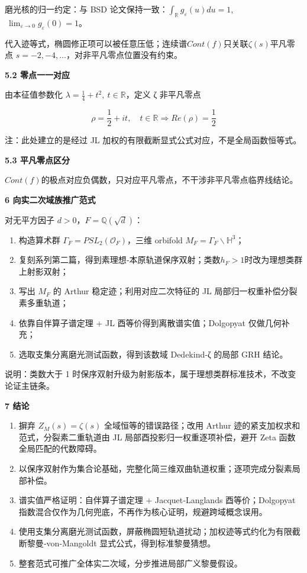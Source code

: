 \documentclass[11pt,a4paper]{ctexart}
\begin{document}
磨光核的归一约定：与 BSD
论文保持一致：\(\int_{\mathbb{R}}^{}g_{\varepsilon}(u)du = 1\),\(\ \lim_{\varepsilon \rightarrow 0}{g_{\varepsilon}(0)} = 1\)。

代入迹等式，椭圆修正项可以被任意压低；连续谱\(Cont(f)\)只关联\(\zeta(s)\)平凡零点
\(s = - 2, - 4,\ldots\)，对非平凡零点位置没有约束。

\textbf{5.2 零点一一对应}

由本征值参数化
\(\lambda = \frac{1}{4} + t^{2},\ t \in \mathbb{R}\)，定义 ζ 非平凡零点

\[\rho = \frac{1}{2} + it,\quad t \in \mathbb{R} \Longrightarrow Re(\rho) = \frac{1}{2}\]

注：此处建立的是经过 JL 加权的有限截断显式公式对应，不是全局函数恒等式。

\textbf{5.3 平凡零点区分}

\(Cont(f)\)的极点对应负偶数，只对应平凡零点，不干涉非平凡零点临界线结论。

\textbf{6 向实二次域族推广范式}

对无平方因子 \(d > 0\)，\(F = \mathbb{Q}\left( \sqrt{d} \right)\)：

\begin{enumerate}
\def\labelenumi{\arabic{enumi}.}
\item
  构造算术群
  \(\Gamma_{F} = {PSL}_{2}\left( \mathcal{O}_{F} \right)\)，三维
  orbifold \(M_{F} = \Gamma_{F}\backslash\mathbb{H}^{3}\)；
\item
  复刻系列第二篇，得到素理想‑本原轨道保序双射；类数\(h_{F} > 1\)时改为理想类群上射影双射；
\item
  写出 \(M_{F}\) 的 Arthur 稳定迹；利用对应二次特征的 JL
  局部归一权重补偿分裂素多重轨道；
\item
  依靠自伴算子谱定理 + JL 酉等价得到离散谱实值；Dolgopyat 仅做几何补充；
\item
  选取支集分离磨光测试函数，得到该数域 Dedekind‑ζ 的局部 GRH 结论。
\end{enumerate}

说明：类数大于 1
时保序双射升级为射影版本，属于理想类群标准技术，不改变论证主链条。

\textbf{7 结论}

\begin{enumerate}
\def\labelenumi{\arabic{enumi}.}
\item
  摒弃 \(Z_{M}(s) = \zeta(s)\) 全域恒等的错误路径；改用 Arthur
  迹的紧支加权求和范式，分裂素二重轨道由 JL
  局部酉投影归一权重逐项补偿，避开 Zeta 函数全局匹配的代数障碍。
\item
  以保序双射作为集合论基础，完整化简三维双曲轨道权重；逐项完成分裂素局部补偿。
\item
  谱实值严格证明：自伴算子谱定理 + Jacquet‑Langlands 酉等价；Dolgopyat
  指数混合仅作为几何兜底，不再作为核心证明，规避跨域概念误用。
\item
  使用支集分离磨光测试函数，屏蔽椭圆短轨道扰动；加权迹等式约化为有限截断黎曼‑von‑Mangoldt
  显式公式，得到标准黎曼猜想。
\item
  整套范式可推广全体实二次域，分步推进局部广义黎曼假设。
\end{enumerate}
\end{document}
